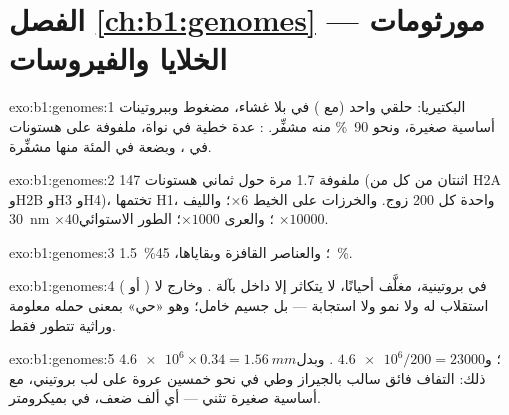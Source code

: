 \section*{الفصل \ref{ch:b1:genomes} --- مورثومات الخلايا والفيروسات}

\begin{solution}{exo:b1:genomes:1}
البكتيريا:  حلقي واحد (مع ) في  بلا غشاء، مضغوط
 وببروتينات أساسية صغيرة، ونحو \qty{90}{\%} منه
مشفِّر. : عدة  خطية في نواة، ملفوفة على هستونات في
، وبضعة في المئة منها مشفِّرة.
\end{solution}

\begin{solution}{exo:b1:genomes:2}
147  ملفوفة 1.7 مرة حول ثماني هستونات (اثنتان من كل من H2A
وH2B وH3 وH4)، تختمها H1، واحدة كل 200 زوج. والخرزات على الخيط
$\times 6$؛ والليف \qty{30}{nm} $\times 40$؛ والعرى $\times 1000$؛
 الطور الاستوائي $\times \num{10000}$.
\end{solution}

\begin{solution}{exo:b1:genomes:3}
\qty{1.5}{\%}؛ والعناصر القافزة وبقاياها، \qty{45}{\%}.
\end{solution}

\begin{solution}{exo:b1:genomes:4}
 ( أو ) في  بروتينية، مغلَّف أحيانًا، لا يتكاثر إلا
داخل  بآلة . وخارج  لا استقلاب له ولا نمو ولا استجابة
--- بل جسيم خامل؛ وهو «حي» بمعنى حمله معلومة وراثية تتطور فقط.
\end{solution}

\begin{solution}{exo:b1:genomes:5}
$\num{4.6e6}\times 0.34 = \qty{1.56}{mm}$؛ و$\num{4.6e6}/200 = \num{23000}$
. وبدل ذلك: التفاف فائق سالب بالجيراز وطي في نحو خمسين عروة
على لب بروتيني، مع  أساسية صغيرة تثني  --- أي ألف ضعف، في
 بميكرومتر.
\end{solution}

